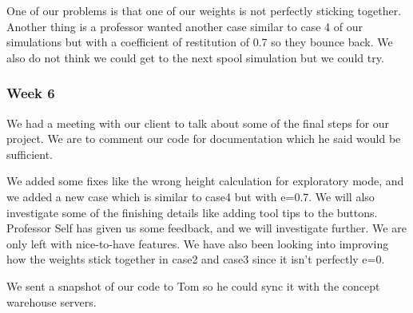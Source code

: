 One of our problems is that one of our weights is not perfectly sticking together. Another thing is a professor wanted another case similar to case 4 of our simulations but with a coefficient of restitution of 0.7 so they bounce back. We also do not think we could get to the next spool simulation but we could try. 
\subsubsection{Week 6}
We had a meeting with our client to talk about some of the final steps for our project. We are to comment our code for documentation which he said would be sufficient. 

We added some fixes like the wrong height calculation for exploratory mode, and we added a new case which is similar to case4 but with e=0.7. We will also investigate some of the finishing details like adding tool tips to the buttons. Professor Self has given us some feedback, and we will investigate further. We are only left with nice-to-have features. We have also been looking into improving how the weights stick together in case2 and case3 since it isn't perfectly e=0. 

We sent a snapshot of our code to Tom so he could sync it with the concept warehouse servers. 

